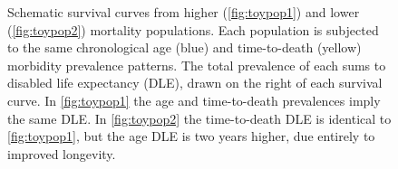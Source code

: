 \documentclass[12pt,oneside,letterpaper,doublespacing]{article}  %
\begin{document}
\begin{figure}
\caption{Schematic survival curves from higher (\ref{fig:toypop1}) and lower
(\ref{fig:toypop2}) mortality populations. Each population is
subjected to the same chronological age (blue) and time-to-death (yellow)
morbidity prevalence patterns. The total prevalence of each sums to disabled life expectancy
(DLE), drawn on the right of each survival curve. In \ref{fig:toypop1}
the age and time-to-death prevalences imply the same DLE. In
\ref{fig:toypop2} the time-to-death DLE is identical to \ref{fig:toypop1}, but
the age DLE is two years higher, due entirely to improved longevity.}
\label{fig:test}
\end{figure}
\end{document}
